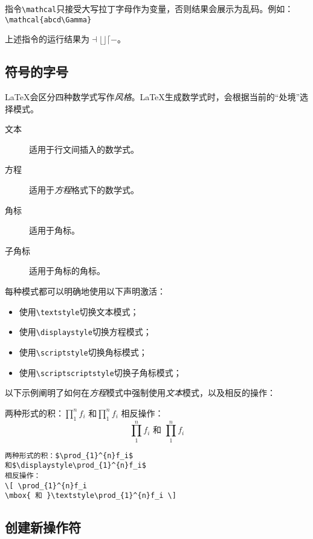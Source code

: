 \begin{exclamation}
指令\verb|\mathcal|只接受大写拉丁字母作为变量，否则结果会展示为乱码。例如：\\
\verb|\mathcal{abcd\Gamma}|

上述指令的运行结果为$\dashv \lfloor \rfloor \lceil -$。
\end{exclamation}

\subsection{符号的字号}

\LaTeX 会区分四种数学式写作\emph{风格}。\LaTeX 生成数学式时，会根据当前的``处境''选择模式。

\begin{description}
  \item[文本] 适用于行文间插入的数学式。
  \item[方程] 适用于\emph{方程}格式下的数学式。
  \item[角标] 适用于角标。
  \item[子角标] 适用于角标的角标。 
\end{description}

每种模式都可以明确地使用以下声明激活：

\begin{itemize}
  \item 使用\verb|\textstyle|切换文本模式；
  \item 使用\verb|\displaystyle|切换方程模式；
  \item 使用\verb|\scriptstyle|切换角标模式；
  \item 使用\verb|\scriptscriptstyle|切换子角标模式；
\end{itemize}

以下示例阐明了如何在\emph{方程}模式中强制使用\emph{文本}模式，以及相反的操作：

\begin{codelist}[3.24]{
两种形式的积：$\prod_{1}^{n}f_i$
和$\displaystyle\prod_{1}^{n}f_i$
相反操作：
\[ \prod_{1}^{n}f_i
\mbox{ 和 }\textstyle\prod_{1}^{n}f_i \]
}
\begin{verbatim}
两种形式的积：$\prod_{1}^{n}f_i$
和$\displaystyle\prod_{1}^{n}f_i$
相反操作：
\[ \prod_{1}^{n}f_i
\mbox{ 和 }\textstyle\prod_{1}^{n}f_i \]\end{verbatim}
\end{codelist}

\subsection{创建新操作符}

